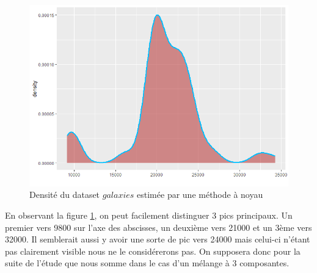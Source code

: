 \documentclass[a4paper,french,10pt]{article}
\begin{document}
\begin{figure}[htp] 
	\centering
	\includegraphics[scale=0.45]{images/realDataDensEst.png}
	\caption{Densité du dataset $galaxies$ estimée par une méthode à noyau}
	\label{realDataDensEst}
\end{figure}

En observant la figure \ref{realDataDensEst}, on peut facilement distinguer 3 pics principaux. Un premier vers 9800 sur l'axe des abscisses, un deuxième vers 21000 et un 3ème vers 32000. Il semblerait aussi y avoir une sorte de pic vers 24000 mais celui-ci n'étant pas clairement visible nous ne le considérerons pas. On supposera donc pour la suite de l'étude que nous somme dans le cas d'un mélange à 3 composantes.



\end{document}
